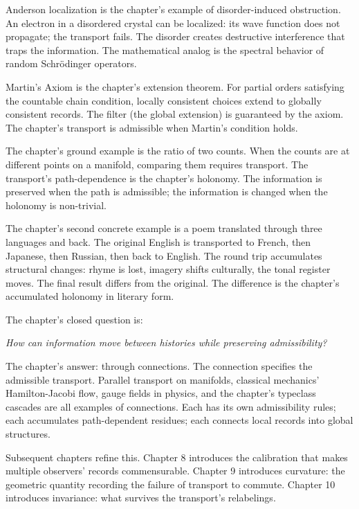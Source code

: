 \begin{chapteressay}
Anderson localization is the chapter's example of disorder-induced
obstruction. An electron in a disordered crystal can be
localized: its wave function does not propagate; the transport
fails. The disorder creates destructive interference that traps
the information. The mathematical analog is the spectral
behavior of random Schr\"odinger operators.

Martin's Axiom is the chapter's extension theorem. For partial
orders satisfying the countable chain condition, locally
consistent choices extend to globally consistent records. The
filter (the global extension) is guaranteed by the axiom. The
chapter's transport is admissible when Martin's condition holds.

The chapter's ground example is the ratio of two counts. When the
counts are at different points on a manifold, comparing them
requires transport. The transport's path-dependence is the
chapter's holonomy. The information is preserved when the path
is admissible; the information is changed when the holonomy is
non-trivial.

The chapter's second concrete example is a poem translated
through three languages and back. The original English is
transported to French, then Japanese, then Russian, then back
to English. The round trip accumulates structural changes:
rhyme is lost, imagery shifts culturally, the tonal register
moves. The final result differs from the original. The
difference is the chapter's accumulated holonomy in literary
form.

The chapter's closed question is:

\begin{center}
\emph{How can information move between histories while preserving
admissibility?}
\end{center}

The chapter's answer: through connections. The connection
specifies the admissible transport. Parallel transport on
manifolds, classical mechanics' Hamilton-Jacobi flow, gauge
fields in physics, and the chapter's typeclass cascades are all
examples of connections. Each has its own admissibility rules;
each accumulates path-dependent residues; each connects local
records into global structures.

Subsequent chapters refine this. Chapter 8 introduces the
calibration that makes multiple observers' records commensurable.
Chapter 9 introduces curvature: the geometric quantity recording
the failure of transport to commute. Chapter 10 introduces
invariance: what survives the transport's relabelings.

\end{chapteressay}

